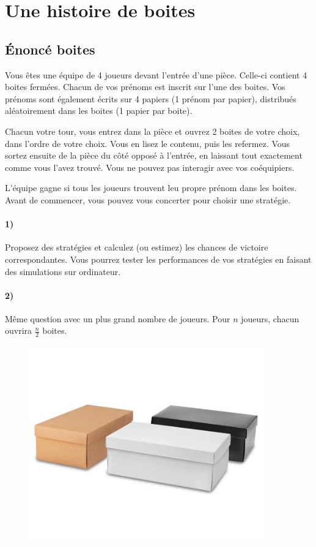 \documentclass[a4paper,10pt,oneside]{article}
\begin{document}
\section{Une histoire de boites}

\subsection{Énoncé boites}

Vous êtes une équipe de 4 joueurs devant l'entrée d'une pièce. 
Celle-ci contient 4 boites fermées.
Chacun de vos prénoms est inscrit sur l'une des boites.
Vos prénoms sont également écrits sur 4 papiers (1 prénom par papier), distribués aléatoirement dans les boites (1 papier par boite).

Chacun votre tour, vous entrez dans la pièce et ouvrez 2 boites de votre choix, dans l'ordre de votre choix. 
Vous en lisez le contenu, puis les refermez.
Vous sortez ensuite de la pièce du côté opposé à l'entrée, en laissant tout exactement comme vous l'avez trouvé.
Vous ne pouvez pas interagir avec vos coéquipiers.

L'équipe gagne si tous les joueurs trouvent leu propre prénom dans les boites. Avant de commencer, vous pouvez vous concerter pour choisir une stratégie.

\paragraph*{1)}
Proposez des stratégies et calculez (ou estimez) les chances de victoire correspondantes.
Vous pourrez tester les performances de vos stratégies en faisant des simulations sur ordinateur.

\paragraph*{2)} 
Même question avec un plus grand nombre de joueurs. Pour $n$ joueurs, chacun ouvrira $\frac{n}{2}$ boites.

\vspace{3cm}
\begin{figure}[!ht]
  \centering
  \includegraphics[width=0.9\textwidth]{figures/boites.png}
\end{figure}
\end{document}
